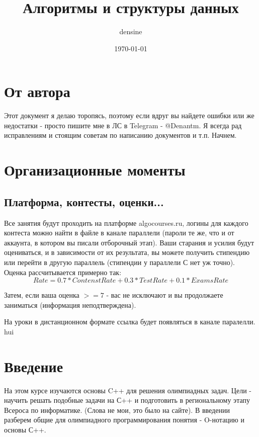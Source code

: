 \documentclass[a4paper,12pt]{article}
\title{Алгоритмы и структуры данных}
\author{densine}
\date{\today}
\begin{document}
\maketitle
\tableofcontents

\section{От автора}
Этот документ я делаю торопясь, поэтому если вдруг вы найдете ошибки или же недостатки -
просто пишите мне в ЛС в Telegram - @Denantm. Я всегда рад исправлениям и стоящим
советам по написанию документов и т.п. Начнем.

\section{Организационные моменты}

\subsection{Платформа, контесты, оценки...}
Все занятия будут проходить на платформе algocourses.ru, логины для каждого контеста можно
найти в файле в канале параллели (пароли те же, что и от аккаунта, в котором вы писали
отборочный этап).
Ваши старания и усилия будут оцениваться, и в зависимости от их результата, вы можете получить
стипендию или перейти в другую параллель (стипендии у параллели С нет уж точно).
Оценка рассчитывается примерно так:
\[
	Rate = 0.7 * ContenstRate + 0.3 * TestRate + 0.1 * ExamsRate
\]

Затем, если ваша оценка  $>=7$ - вас не исключают и вы продолжаете заниматься (информация
неподтверждена).

На уроки в дистанционном формате ссылка будет появляться в канале паралелли.
hui

\section{Введение}
На этом курсе изучаются основы C++ для решения олимпиадных задач. Цели - научить
решать подобные задачи на С++ и подготовить в региональному этапу Всероса по информатике.
(Слова не мои, это было на сайте). В введении разберем общие для олимпиадного
программирования понятия - O-нотацию и основы С++.
\end{document}

